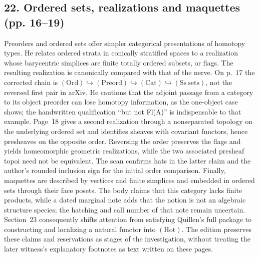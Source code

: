 \subsection*{22. Ordered sets, realizations and maquettes (pp. 16--19)}
Preorders and ordered sets offer simpler categorical presentations of homotopy types. He relates ordered strata in conically stratified spaces to a realization whose barycentric simplices are finite totally ordered subsets, or flags. The resulting realization is canonically compared with that of the nerve. On p.~17 the corrected chain is $(\mathrm{Ord})\hookrightarrow(\mathrm{Preord})\hookrightarrow(\mathrm{Cat})\hookrightarrow(\mathrm{Ss\ sets})$, not the reversed first pair in arXiv. He cautions that the adjoint passage from a category to its object preorder can lose homotopy information, as the one-object case shows; the handwritten qualification ``but not Fl(A)'' is indispensable to that example. Page~18 gives a second realization through a nonseparated topology on the underlying ordered set and identifies sheaves with covariant functors, hence presheaves on the opposite order. Reversing the order preserves the flags and yields homeomorphic geometric realizations, while the two associated presheaf topoi need not be equivalent. The scan confirms hats in the latter claim and the author's rounded inclusion sign for the initial order comparison. Finally, maquettes are described by vertices and finite simplices and embedded in ordered sets through their face posets. The body claims that this category lacks finite products, while a dated marginal note adds that the notion is not an algebraic structure species; the hatching and call number of that note remain uncertain. Section~23 consequently shifts attention from satisfying Quillen's full package to constructing and localizing a natural functor into $(\mathrm{Hot})$. The edition preserves these claims and reservations as stages of the investigation, without treating the later witness's explanatory footnotes as text written on these pages.

